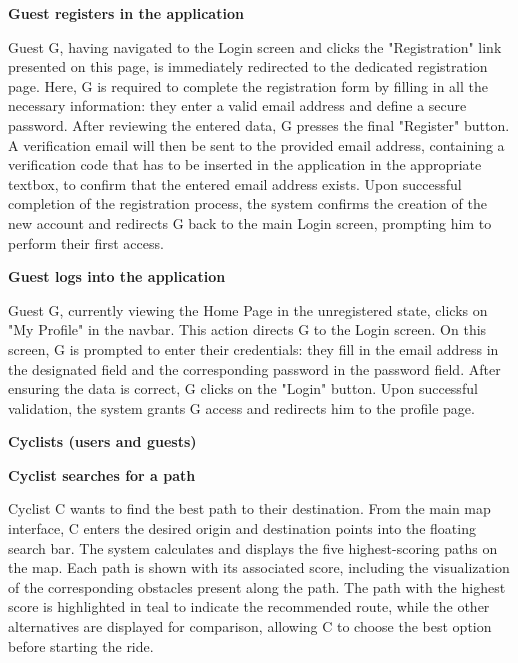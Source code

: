     \noindent
    \textbf{Guest registers in the application}
    \vspace{1mm}
    
    \noindent
    Guest G, having navigated to the Login screen and clicks the "Registration" link presented on this page, is immediately redirected to the dedicated registration page. Here, G is required to complete the registration form by filling in all the necessary information: they enter a valid email address and define a secure password. After reviewing the entered data, G presses the final "Register" button. A verification email will then be sent to the provided email address, containing a verification code that has to be inserted in the application in the appropriate textbox, to confirm that the entered email address exists. Upon successful completion of the registration process, the system confirms the creation of the new account and redirects G back to the main Login screen, prompting him to perform their first access.

    \vspace{3mm}

    \noindent
    \textbf{Guest logs into the application}
    \vspace{1mm}
    
    \noindent
    Guest G, currently viewing the Home Page in the unregistered state, clicks on "My Profile" in the navbar. This action directs G to the Login screen. On this screen, G is prompted to enter their credentials: they fill in the email address in the designated field and the corresponding password in the password field. After ensuring the data is correct, G clicks on the "Login" button. Upon successful validation, the system grants G access and redirects him to the profile page.

    \vspace{3mm}

    \noindent
    \textbf{Cyclists (users and guests)} 
    \vspace{2mm}
  
    \noindent
    \textbf{Cyclist searches for a path} 
    \vspace{1mm}
    
    \noindent
     Cyclist C wants to find the best path to their destination. From the main map interface, C enters the desired origin and destination points into the floating search bar. The system calculates and displays the five highest-scoring paths on the map. Each path is shown with its associated score, including the visualization of the corresponding obstacles present along the path. The path with the highest score is highlighted in teal to indicate the recommended route, while the other alternatives are displayed for comparison, allowing C to choose the best option before starting the ride.

